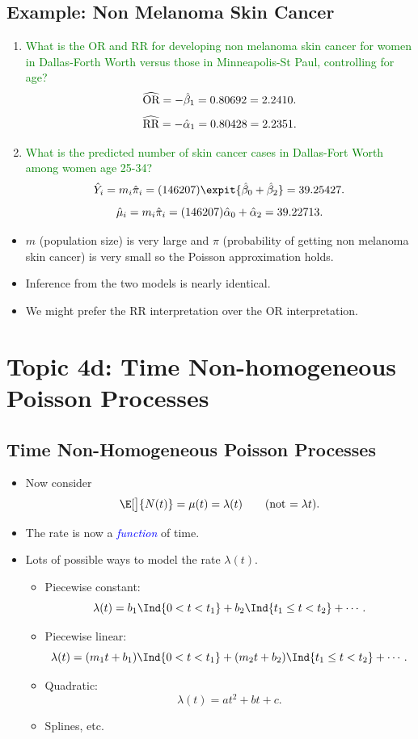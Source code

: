\documentclass{article}\usepackage[]{graphicx}\usepackage[svgnames]{xcolor}
\let\exp\relax%
\newcommand{\OR}{\text{OR}}%
\newcommand{\RR}{\text{RR}}%
\begin{document}
\subsection*{Example: Non Melanoma Skin Cancer}
\begin{enumerate}[1.]
    \item \textcolor{Green}{What is the OR and RR for developing non melanoma skin cancer for women in
              Dallas-Forth Worth versus those in Minneapolis-St Paul, controlling for age?}
          \[ \widehat{\OR}=\exp{-\hat{\beta}_1}=\exp{0.80692}=2.2410. \]
          \[ \widehat{\RR}=\exp{-\hat{\alpha}_1}=\exp{0.80428}=2.2351. \]
    \item \textcolor{Green}{What is the predicted number of skin cancer cases in Dallas-Fort Worth among
              women age 25-34?}
          \[ \hat{Y}_i=m_i\hat{\pi}_i=(146207)\expit{\hat{\beta}_0+\hat{\beta}_2}=39.25427. \]
          \[ \hat{\mu}_i=m_i\hat{\pi}_i=(146207)\exp{\hat{\alpha}_0+\hat{\alpha}_2}=39.22713. \]
\end{enumerate}
\begin{itemize}
    \item $m$ (population size) is very large and $ \pi $ (probability of getting non melanoma skin
          cancer) is very small so the Poisson approximation holds.
    \item Inference from the two models is nearly identical.
    \item We might prefer the RR interpretation over the OR interpretation.
\end{itemize}

\section*{Topic 4d: Time Non-homogeneous Poisson Processes}
\subsection*{Time Non-Homogeneous Poisson Processes}
\begin{itemize}
    \item Now consider
          \[ \E[\big]{N(t)}=\mu(t)=\lambda(t)\qquad\text{(not $=\lambda t$)}. \]
    \item The rate is now a \emph{\textcolor{Blue}{function}} of time.
    \item Lots of possible ways to model the rate $ \lambda(t) $.
          \begin{itemize}
              \item Piecewise constant:
                    \[ \lambda(t)=b_1\Ind{0<t<t_1}+b_2\Ind{t_1\le t<t_2}+\cdots. \]
              \item Piecewise linear:
                    \[ \lambda(t)=(m_1 t+b_1)\Ind{0<t<t_1}+(m_2 t+b_2)\Ind{t_1\le t<t_2}+\cdots. \]
              \item Quadratic:
                    \[ \lambda(t)=at^2+bt+c. \]
              \item Splines, etc.
          \end{itemize}
\end{itemize}
\end{document}
